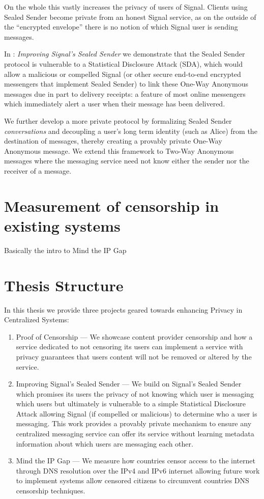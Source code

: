On the whole this vastly increases the privacy of users of Signal. Clients using
Sealed Sender become private from an honest Signal service, as on the outside of
the ``encrypted envelope'' there is no notion of which Signal user is sending
messages.

In : \emph{Improving Signal's Sealed Sender} we demonstrate that
the Sealed Sender protocol is vulnerable to a Statistical Disclosure Attack
(SDA), which would allow a malicious or compelled Signal (or other secure
end-to-end encrypted messengers that implement Sealed Sender) to link these
One-Way Anonymous messages due in part to delivery receipts: a feature of most
online messengers which immediately alert a user when their message has been
delivered.

We further develop a more private protocol by formalizing Sealed Sender
\emph{conversations} and decoupling a user's long term identity (such as Alice)
from the destination of messages, thereby creating a provably private One-Way
Anonymous message. We extend this framework to Two-Way Anonymous messages where
the messaging service need not know either the sender nor the receiver of a
message. 

\section{Measurement of censorship in existing systems}
Basically the intro to Mind the IP Gap

\section{Thesis Structure}
In this thesis we provide three projects geared towards enhancing Privacy in
Centralized Systems:

\begin{enumerate}
    \item Proof of Censorship --- We showcase content provider censorship and
    how a service dedicated to not censoring its users can implement a service
    with privacy guarantees that users content will not be removed or altered by
    the service.
    \item Improving Signal's Sealed Sender --- We build on Signal's Sealed
    Sender which promises its users the privacy of not knowing which user is
    messaging which users but ultimately is vulnerable to a simple Statistical
    Disclosure Attack allowing Signal (if compelled or malicious) to determine
    who a user is messaging. This work provides a provably private mechanism to
    ensure any centralized messaging service can offer its service without
    learning metadata information about which users are messaging each other.
    \item Mind the IP Gap --- We measure how countries censor access to the
    internet through DNS resolution over the IPv4 and IPv6 internet allowing
    future work to implement systems allow censored citizens to circumvent
    countries DNS censorship techniques.
\end{enumerate}